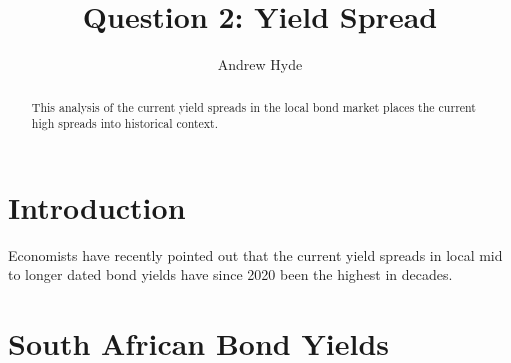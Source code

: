\documentclass[11pt,preprint, authoryear]{elsarticle}
\numberwithin{equation}{section}
\numberwithin{figure}{section}
\numberwithin{table}{section}
\begin{document}
\begin{frontmatter}  %

\title{Question 2: Yield Spread}





\author[Add1]{Andrew Hyde}





\address[Add1]{Stellenbosch University, South Africa}


\begin{abstract}
\small{
This analysis of the current yield spreads in the local bond market
places the current high spreads into historical context.
}
\end{abstract}

\vspace{1cm}





\vspace{0.5cm}

\end{frontmatter}



\pagestyle{fancy}
\chead{}
\rhead{}
\lfoot{}
\lhead{}
\cfoot{}


\headsep 35pt %




\hypertarget{introduction}{%
\section{\texorpdfstring{Introduction
\label{Introduction}}{Introduction }}\label{introduction}}

Economists have recently pointed out that the current yield spreads in
local mid to longer dated bond yields have since 2020 been the highest
in decades.

\hypertarget{south-african-bond-yields}{%
\section{South African Bond Yields}\label{south-african-bond-yields}}
\end{document}

